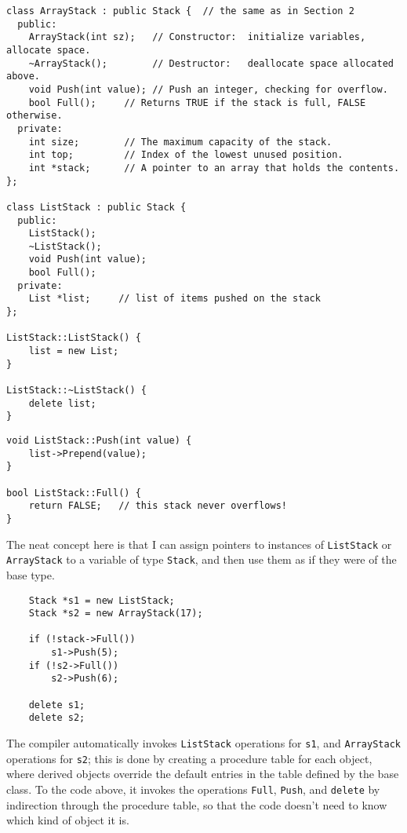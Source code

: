 \begin{verbatim}
class ArrayStack : public Stack {  // the same as in Section 2
  public:
    ArrayStack(int sz);   // Constructor:  initialize variables, allocate space.
    ~ArrayStack();        // Destructor:   deallocate space allocated above.
    void Push(int value); // Push an integer, checking for overflow.
    bool Full();     // Returns TRUE if the stack is full, FALSE otherwise.
  private:
    int size;        // The maximum capacity of the stack.
    int top;         // Index of the lowest unused position.
    int *stack;      // A pointer to an array that holds the contents.
};

class ListStack : public Stack {
  public:
    ListStack();
    ~ListStack();
    void Push(int value);
    bool Full();
  private:
    List *list;		// list of items pushed on the stack
};

ListStack::ListStack() {
    list = new List;
}

ListStack::~ListStack() {
    delete list;
}
\end{verbatim}
\newpage
\begin{verbatim}
void ListStack::Push(int value) {
    list->Prepend(value);
}

bool ListStack::Full() {
    return FALSE; 	// this stack never overflows!
}
\end{verbatim}

The neat concept here is that I can assign pointers to instances of
{\tt ListStack} or {\tt ArrayStack} to a variable of type {\tt Stack}, and
then use them as if they were of the base type.

\begin{verbatim}
    Stack *s1 = new ListStack;
    Stack *s2 = new ArrayStack(17);

    if (!stack->Full())
        s1->Push(5);
    if (!s2->Full())
        s2->Push(6);

    delete s1;
    delete s2;
\end{verbatim}

The compiler automatically invokes {\tt ListStack} operations
for {\tt s1}, and {\tt ArrayStack} operations for {\tt s2};
this is done by creating a procedure table for each object,
where derived objects override the default entries in the table
defined by the base class.  To the code above, it invokes the
operations {\tt Full}, {\tt Push}, and {\tt delete} by indirection
through the procedure table, so that the code doesn't need to know
which kind of object it is.

